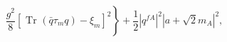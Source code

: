 \begin{equation}
\label{rtact}
\left.
\frac{g^2}8[\mbox{ Tr }(\bar q\tau_m q)-\xi_m]^2\right\}
+\frac12 |q^{fA}|^2|a+\sqrt{2}m_A|^2,
\end{equation}

